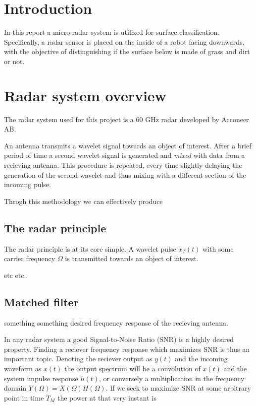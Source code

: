 \documentclass[a4paper, 12pt]{article}
\begin{document}
\section{Introduction}

In this report a micro radar system is utilized for surface classification. Specifically, a radar sensor is placed on the inside of a robot facing downwards, with the objective of distinguishing if the surface below is made of grass and dirt or not.

\section{Radar system overview}

The radar system used for this project is a 60 GHz radar developed by Acconeer AB.

An antenna transmits a wavelet signal towards an object of interest. After a brief period of time a second wavelet signal is generated and \emph{mixed} with data from a recieving antenna. This procedure is repeated, every time slightly delaying the generation of the second wavelet and thus mixing with a different section of the incoming pulse. 

Throgh this methodology we can effectively produce

\subsection{The radar principle}

The radar principle is at its core simple.  A wavelet pulse $x_T(t)$ with some carrier frequency $\Omega$  is transmitted towards an object of interest. 

etc etc..


\subsection{Matched filter}

something something desired frequency response of the recieving antenna. 

In any radar system a good Signal-to-Noise Ratio (SNR) is a highly desired property. Finding a reciever frequency response which maximizes SNR is thus an important topic. Denoting the reciever output as $y(t)$ and the incoming waveform as $x(t)$ the output spectrum will be a convolution of $x(t)$ and the system impulse response $h(t)$, or conversely a multiplication in the frequency domain $Y(\Omega) = X(\Omega)H(\Omega)$. If we seek to maximize SNR at some arbitrary point in time $T_M$ the power at that very instant is
\end{document}
